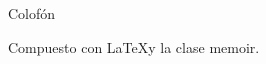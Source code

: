 \cleardoublepage
\pagestyle{empty}
\null\vfil

\begin{adjustwidth}{3cm}{3 cm}
\begin{center}
{\Large\textsf{Colofón}}
\end{center}
\begin{center}
Compuesto con \LaTeX y la clase \textsf{memoir}.  


\end{center}

\end{adjustwidth}

\vfil
